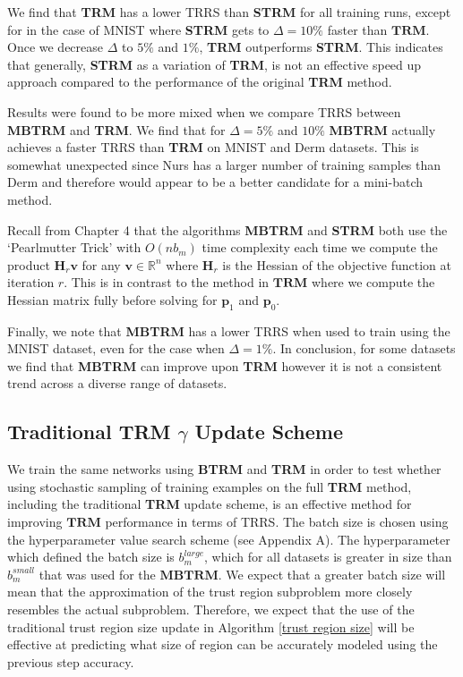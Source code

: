 \documentclass[letterpaper,12pt,titlepage,oneside,final]{book}
\begin{document}
	We find that \textbf{TRM} has a lower TRRS than \textbf{STRM} for all training runs, except for in the case of MNIST where \textbf{STRM} gets to $\Delta = 10\%$ faster than $\textbf{TRM}$. Once we decrease $\Delta$ to $5\%$ and $1\%$, \textbf{TRM} outperforms \textbf{STRM}. This indicates that generally, \textbf{STRM} as a variation of \textbf{TRM}, is not an effective speed up approach compared to the performance of the original \textbf{TRM} method.
	
	Results were found to be more mixed when we compare TRRS between \textbf{MBTRM} and \textbf{TRM}. We find that for $\Delta = 5\%$ and $10\%$ \textbf{MBTRM} actually achieves a faster TRRS than \textbf{TRM} on MNIST and Derm datasets. This is somewhat unexpected since Nurs has a larger number of training samples than Derm and therefore would appear to be a better candidate for a mini-batch method. 
	
	Recall from Chapter 4 that the algorithms \textbf{MBTRM} and \textbf{STRM} both use the `Pearlmutter Trick' with $O(nb_{m})$ time complexity each time we compute the product $\mathbf{H}_{r}\mathbf{v}$ for any $\mathbf{v} \in \mathbb{R}^{n}$ where $\mathbf{H}_{r}$ is the Hessian of the objective function at iteration $r$. This is in contrast to the method in $\mathbf{TRM}$ where we compute the Hessian matrix fully before solving for $\mathbf{p}_{1}$ and $\mathbf{p}_{0}$. 
	
	Finally, we note that \textbf{MBTRM} has a lower TRRS when used to train using the MNIST dataset, even for the case when $\Delta = 1\%$. In conclusion, for some datasets we find that \textbf{MBTRM} can improve upon \textbf{TRM} however it is not a consistent trend across a diverse range of datasets.
	
	
	\subsection{Traditional TRM $\gamma$ Update Scheme}
	
	We train the same networks using \textbf{BTRM} and \textbf{TRM} in order to test whether using stochastic sampling of training examples on the full \textbf{TRM} method, including the traditional \textbf{TRM} update scheme, is an effective method for improving $\mathbf{TRM}$ performance in terms of TRRS. The batch size is chosen using the hyperparameter value search scheme (see Appendix A). The hyperparameter which defined the batch size is $b_{m}^{large}$, which for all datasets is greater in size than $b_{m}^{small}$ that was used for the $\mathbf{MBTRM}$. We expect that a greater batch size will mean that the approximation of the trust region subproblem more closely resembles the actual subproblem. Therefore, we expect that the use of the traditional trust region size update in Algorithm \ref{trust region size} will be effective at predicting what size of region can be accurately modeled using the previous step accuracy.
	
\end{document}

